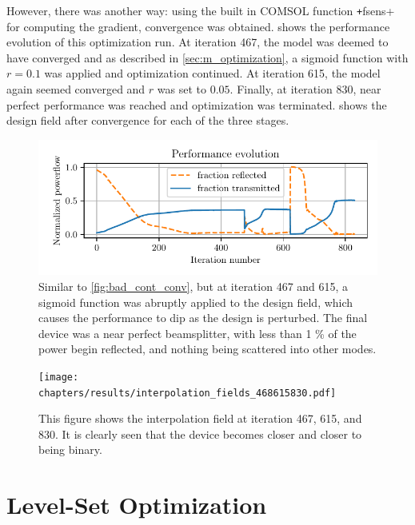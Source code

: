 However, there was another way:
using the built in COMSOL function \texttt+fsens+ for computing
the gradient, convergence was obtained.
 shows the performance evolution of this optimization run.
At iteration 467, the model was deemed to have converged and as described in
\cref{sec:m_optimization}, a sigmoid function with $r=0.1$ was applied and optimization
continued.
At iteration 615, the model again seemed converged and $r$ was set to $0.05$.
Finally, at iteration 830, near perfect performance was reached and optimization
was terminated.
 shows the design field after convergence for each of the
three stages.

\begin{figure}[htpb]
	\centering
	\includegraphics{chapters/results/conv_31.pdf}
	\caption{%
		Similar to \cref{fig:bad_cont_conv},
		but at iteration 467 and 615, a sigmoid function was abruptly applied
		to the design field, which causes the performance to dip as the design is
		perturbed.
		The final device was a near perfect beamsplitter, with less than 1 \% of
		the power begin reflected, and nothing being scattered into other modes.
	}%
	\label{fig:cont_conv1}
\end{figure}

\begin{figure}[htpb]
	\centering
	\texttt{[image: chapters/results/interpolation\_fields\_468615830.pdf]}
	\caption{%
		This figure shows the interpolation field at iteration 467, 615,
		and 830. It is clearly seen that the device becomes closer and closer to
		being binary.
	}%
	\label{fig:cont_design1}
\end{figure}

\section{Level-Set Optimization}\label{sec:res_bin}

